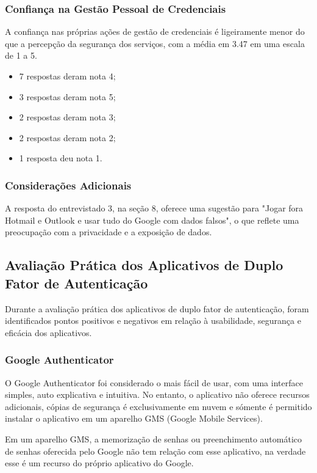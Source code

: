 \documentclass[12pt]{article}
\begin{document}
\subsubsection{Confiança na Gestão Pessoal de Credenciais}

A confiança nas próprias ações de gestão de credenciais é ligeiramente menor do que a
percepção da segurança dos serviços, com a média em 3.47 em uma escala de 1 a 5.

\begin{itemize}
  \item 7 respostas deram nota 4;
  \item 3 respostas deram nota 5;
  \item 2 respostas deram nota 3;
  \item 2 respostas deram nota 2;
  \item 1 resposta deu nota 1.
\end{itemize}

\subsubsection{Considerações Adicionais}

A resposta do entrevistado 3, na seção 8, oferece uma sugestão para "Jogar fora Hotmail
e Outlook e usar tudo do Google com dados falsos", o que reflete uma preocupação com a
privacidade e a exposição de dados.

\subsection{Avaliação Prática dos Aplicativos de Duplo Fator de Autenticação}

Durante a avaliação prática dos aplicativos de duplo fator de autenticação,
foram identificados pontos positivos e negativos em relação à usabilidade,
segurança e eficácia dos aplicativos.

\subsubsection{Google Authenticator}

O Google Authenticator foi considerado o mais fácil de usar, com uma
interface simples, auto explicativa e intuitiva.
No entanto, o aplicativo não oferece recursos adicionais, cópias de segurança
é exclusivamente em nuvem e sómente é permitido instalar o aplicativo em um
aparelho GMS (Google Mobile Services).

Em um aparelho GMS, a memorização de senhas ou preenchimento automático de
senhas oferecida pelo Google não tem relação com esse aplicativo, na verdade
esse é um recurso do próprio aplicativo do Google.
\end{document}
